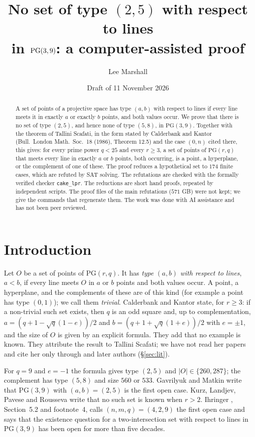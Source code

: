 \documentclass[11pt]{article}
\title{No set of type $(2,5)$ with respect to lines\\in $\PG(3,9)$: a computer-assisted proof}
\author{Lee Marshall}
\date{Draft of 11 November 2026}
\theoremstyle{plain}
\theoremstyle{remark}
\newcommand{\PG}{\mathrm{PG}}
\begin{document}
\maketitle

\begin{abstract}
\noindent
A set of points of a projective space has type $(a,b)$ with respect to lines if every line meets it in exactly $a$ or exactly $b$ points, and both values occur.
We prove that there is no set of type $(2,5)$, and hence none of type $(5,8)$, in $\PG(3,9)$.
Together with the theorem of Tallini Scafati, in the form stated by Calderbank and Kantor (Bull.\ London Math.\ Soc.\ 18 (1986), Theorem 12.5) and the case $(0,n)$ cited there, this gives:
for every prime power $q<25$ and every $r\ge 3$, a set of points of $\PG(r,q)$ that meets every line in exactly $a$ or $b$ points, both occurring, is a point, a hyperplane, or the complement of one of these.
The proof reduces a hypothetical set to $174$ finite cases, which are refuted by SAT solving.
The refutations are checked with the formally verified checker \texttt{cake\_lpr}.
The reductions are short hand proofs, repeated by independent scripts.
The proof files of the main refutations ($571$ GB) were not kept; we give the commands that regenerate them.
The work was done with AI assistance and has not been peer reviewed.
\end{abstract}

\section{Introduction}

Let $O$ be a set of points of $\PG(r,q)$.
It has \emph{type $(a,b)$ with respect to lines}, $a<b$, if every line meets $O$ in $a$ or $b$ points and both values occur.
A point, a hyperplane, and the complements of these are of this kind (for example a point has type $(0,1)$); we call them \emph{trivial}.
Calderbank and Kantor \cite[Theorem 12.5]{CK} state, for $r\ge 3$: if a non-trivial such set exists, then $q$ is an odd square and, up to complementation, $a=(q+1-\sqrt q(1-e))/2$ and $b=(q+1+\sqrt q(1+e))/2$ with $e=\pm1$, and the size of $O$ is given by an explicit formula.
They add that no example is known.
They attribute the result to Tallini Scafati; we have not read her papers and cite her only through \cite{CK} and later authors (\S\ref{sec:lit}).

For $q=9$ and $e=-1$ the formula gives type $(2,5)$ and $|O|\in\{260,287\}$; the complement has type $(5,8)$ and size $560$ or $533$.
Gavrilyuk and Matkin \cite{GM} write that $\PG(3,9)$ with $(a,b)=(2,5)$ is the first open case.
Kurz, Landjev, Pavese and Rousseva \cite{KLPR} write that no such set is known when $r>2$.
Ihringer \cite{Ihr}, Section~5.2 and footnote~4, calls $(n,m,q)=(4,2,9)$ the first open case and says that the existence question for a two-intersection set with respect to lines in $\PG(3,9)$ has been open for more than five decades.
\end{document}
